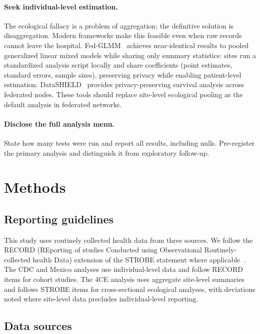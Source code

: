 \documentclass[11pt]{article}
\begin{document}
\paragraph{Seek individual-level estimation.}
The ecological fallacy is a problem of aggregation; the definitive
solution is disaggregation.  Modern frameworks make this feasible even
when raw records cannot leave the hospital.
Fed-GLMM~\cite{chen2023fedglmm} achieves near-identical results to
pooled generalized linear mixed models while sharing only summary
statistics: sites run a standardized analysis script locally and share
coefficients (point estimates, standard errors, sample sizes), preserving
privacy while enabling patient-level estimation.
DataSHIELD~\cite{wilson2022datashield} provides privacy-preserving
survival analysis across federated nodes.  These tools should replace
site-level ecological pooling as the default analysis in federated
networks.

\paragraph{Disclose the full analysis menu.}
State how many tests were run and report all results, including nulls.
Pre-register the primary analysis and distinguish it from exploratory
follow-up.


\section{Methods}

\subsection{Reporting guidelines}

This study uses routinely collected health data from three sources.
We follow the RECORD (REporting of studies Conducted using
Observational Routinely-collected health Data) extension of the
STROBE statement where applicable~\cite{benchimol2015record}.
The CDC and Mexico analyses use individual-level data and follow
RECORD items for cohort studies.  The 4CE analysis uses aggregate
site-level summaries and follows STROBE items for cross-sectional
ecological analyses, with deviations noted where site-level data
precludes individual-level reporting.

\subsection{Data sources}
\end{document}
